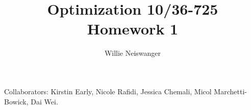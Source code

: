 \documentclass{article}
\title{Optimization 10/36-725\\
        Homework 1}
\author{Willie Neiswanger}
\date{}
\begin{document}
\maketitle

Collaborators: Kirstin Early, Nicole Rafidi, Jessica Chemali, Micol Marchetti-Bowick, Dai Wei.
\end{document}
